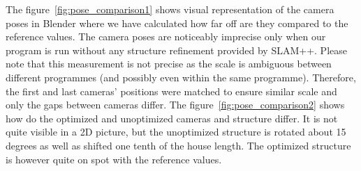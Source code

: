 The figure~\ref{fig:pose_comparison1} shows visual representation of the camera poses in Blender where we have calculated how far off are they compared to the reference values. The camera poses are noticeably imprecise only when our program is run without any structure refinement provided by SLAM++. Please note that this measurement is not precise as the scale is ambiguous between different programmes (and possibly even within the same programme). Therefore, the first and last cameras' positions were matched to ensure similar scale and only the gaps between cameras differ. The figure~\ref{fig:pose_comparison2} shows how do the optimized and unoptimized cameras and structure differ. It is not quite visible in a 2D picture, but the unoptimized structure is rotated about 15 degrees as well as shifted one tenth of the house length. The optimized structure is however quite on spot with the reference values.

